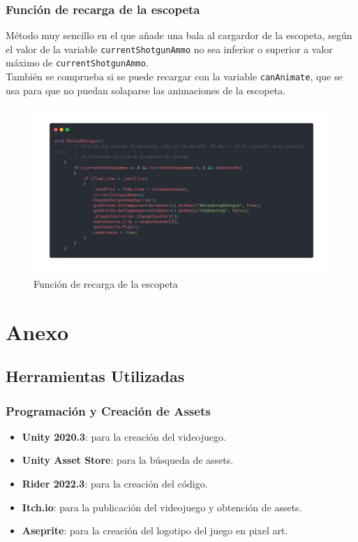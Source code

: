 \documentclass[12pt]{article}
\begin{document}
        \subsubsection{Función de recarga de la escopeta}  
            Método muy sencillo en el que añade una bala al cargardor de la escopeta, según el valor de la variable \texttt{currentShotgunAmmo} no sea inferior o superior a valor máximo de \texttt{currentShotgunAmmo}.\\
            También se comprueba si se puede recargar con la variable \texttt{canAnimate}, que se usa para que no puedan solaparse las animaciones de la escopeta. 
            \begin{figure}[H]
                \centering
                \includegraphics[width=\textwidth]{Images/ShootyMacShooty/reload.png}
                \caption{Función de recarga de la escopeta}
            \end{figure}

\newpage
\section{Anexo}
    \subsection{Herramientas Utilizadas}
        \subsubsection{Programación y Creación de Assets}

            \begin{itemize}
                \item \textbf{Unity 2020.3}: \cite{Unity} para la creación del videojuego.
                \item \textbf{Unity Asset Store}: \cite{assetstore} para la búsqueda de assets.            
                \item \textbf{Rider 2022.3}: \cite{rider} para la creación del código.
                \item \textbf{Itch.io}: \cite{itch} para la publicación del videojuego y obtención de assets.
                \item \textbf{Aseprite}: \cite{aseprite} para la creación del logotipo del juego en pixel art.
            \end{itemize}
            
\end{document}
